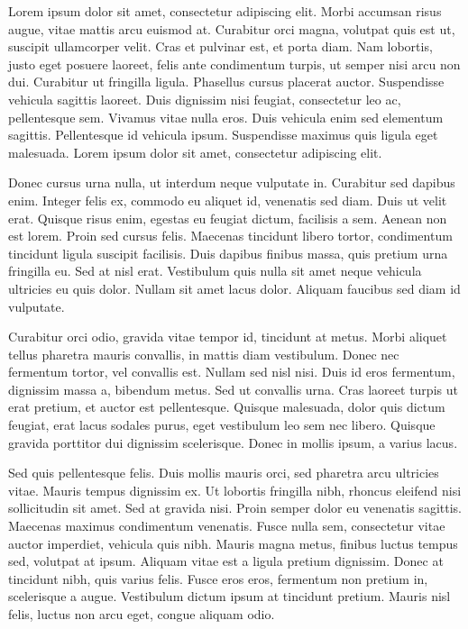Lorem ipsum dolor sit amet, consectetur adipiscing elit. Morbi accumsan risus augue, vitae mattis arcu euismod at. Curabitur orci magna, volutpat quis est ut, suscipit ullamcorper velit. Cras et pulvinar est, et porta diam. Nam lobortis, justo eget posuere laoreet, felis ante condimentum turpis, ut semper nisi arcu non dui. Curabitur ut fringilla ligula. Phasellus cursus placerat auctor. Suspendisse vehicula sagittis laoreet. Duis dignissim nisi feugiat, consectetur leo ac, pellentesque sem. Vivamus vitae nulla eros. Duis vehicula enim sed elementum sagittis. Pellentesque id vehicula ipsum. Suspendisse maximus quis ligula eget malesuada. Lorem ipsum dolor sit amet, consectetur adipiscing elit.

Donec cursus urna nulla, ut interdum neque vulputate in. Curabitur sed dapibus enim. Integer felis ex, commodo eu aliquet id, venenatis sed diam. Duis ut velit erat. Quisque risus enim, egestas eu feugiat dictum, facilisis a sem. Aenean non est lorem. Proin sed cursus felis. Maecenas tincidunt libero tortor, condimentum tincidunt ligula suscipit facilisis. Duis dapibus finibus massa, quis pretium urna fringilla eu. Sed at nisl erat. Vestibulum quis nulla sit amet neque vehicula ultricies eu quis dolor. Nullam sit amet lacus dolor. Aliquam faucibus sed diam id vulputate.

Curabitur orci odio, gravida vitae tempor id, tincidunt at metus. Morbi aliquet tellus pharetra mauris convallis, in mattis diam vestibulum. Donec nec fermentum tortor, vel convallis est. Nullam sed nisl nisi. Duis id eros fermentum, dignissim massa a, bibendum metus. Sed ut convallis urna. Cras laoreet turpis ut erat pretium, et auctor est pellentesque. Quisque malesuada, dolor quis dictum feugiat, erat lacus sodales purus, eget vestibulum leo sem nec libero. Quisque gravida porttitor dui dignissim scelerisque. Donec in mollis ipsum, a varius lacus.

Sed quis pellentesque felis. Duis mollis mauris orci, sed pharetra arcu ultricies vitae. Mauris tempus dignissim ex. Ut lobortis fringilla nibh, rhoncus eleifend nisi sollicitudin sit amet. Sed at gravida nisi. Proin semper dolor eu venenatis sagittis. Maecenas maximus condimentum venenatis. Fusce nulla sem, consectetur vitae auctor imperdiet, vehicula quis nibh. Mauris magna metus, finibus luctus tempus sed, volutpat at ipsum. Aliquam vitae est a ligula pretium dignissim. Donec at tincidunt nibh, quis varius felis. Fusce eros eros, fermentum non pretium in, scelerisque a augue. Vestibulum dictum ipsum at tincidunt pretium. Mauris nisl felis, luctus non arcu eget, congue aliquam odio.

